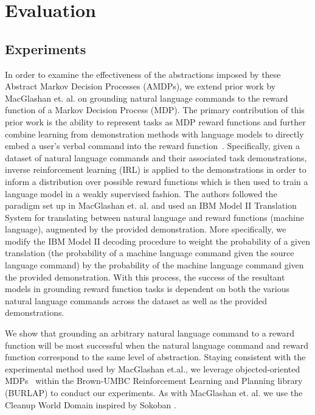 \documentclass[conference]{IEEEtran}
\begin{document}
\section{Evaluation}

\subsection{Experiments}

In order to examine the effectiveness of the abstractions imposed by these Abstract Markov Decision Processes (AMDPs), we extend prior work by MacGlashan et. al. on grounding natural language commands to the reward function of a Markov Decision Process (MDP). The primary contribution of this prior work is the ability to represent tasks as MDP reward functions and further combine learning from demonstration methods with language models to directly embed a user's verbal command into the reward function~\cite{MacGlashan2015GroundingEC}. Specifically, given a dataset of natural language commands and their associated task demonstrations, inverse reinforcement learning (IRL) is applied to the demonstrations in order to inform a distribution over possible reward functions which is then used to train a language model in a weakly supervised fashion. The authors followed the paradigm set up in MacGlashan et. al. and used an IBM Model II Translation System for translating between natural language and reward functions (machine language), augmented by the provided demonstration. More specifically, we modify the IBM Model II decoding procedure to weight the probability of a given translation (the probability of a machine language command given the source language command) by the probability of the machine language command given the provided demonstration. With this process, the success of the resultant models in grounding reward function tasks is dependent on both the various natural language commands across the dataset as well as the provided demonstrations.

We show that grounding an arbitrary natural language command to a reward function will be most successful when the natural language command and reward function correspond to the same level of abstraction. Staying consistent with the experimental method used by MacGlashan et.al., we leverage objected-oriented MDPs~\cite{Diuk2008AnOR} within the Brown-UMBC Reinforcement Learning and Planning library (BURLAP) to conduct our experiments. As with MacGlashan et. al. we use the Cleanup World Domain inspired by Sokoban \cite{Junghanns2001SokobanEG}.
\end{document}
